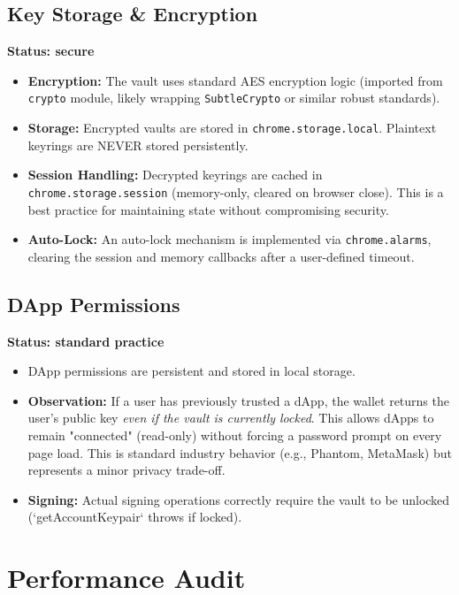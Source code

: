 \documentclass[11pt, a4paper]{article}
\begin{document}
\subsection{Key Storage \& Encryption}
\textbf{Status: secure}
\begin{itemize}
    \item \textbf{Encryption:} The vault uses standard AES encryption logic (imported from \texttt{crypto} module, likely wrapping \texttt{SubtleCrypto} or similar robust standards).
    \item \textbf{Storage:} Encrypted vaults are stored in \texttt{chrome.storage.local}. Plaintext keyrings are NEVER stored persistently.
    \item \textbf{Session Handling:} Decrypted keyrings are cached in \texttt{chrome.storage.session} (memory-only, cleared on browser close). This is a best practice for maintaining state without compromising security.
    \item \textbf{Auto-Lock:} An auto-lock mechanism is implemented via \texttt{chrome.alarms}, clearing the session and memory callbacks after a user-defined timeout.
\end{itemize}

\subsection{DApp Permissions}
\textbf{Status: standard practice}
\begin{itemize}
    \item DApp permissions are persistent and stored in local storage.
    \item \textbf{Observation:} If a user has previously trusted a dApp, the wallet returns the user's public key \textit{even if the vault is currently locked}. This allows dApps to remain "connected" (read-only) without forcing a password prompt on every page load. This is standard industry behavior (e.g., Phantom, MetaMask) but represents a minor privacy trade-off.
    \item \textbf{Signing:} Actual signing operations correctly require the vault to be unlocked (`getAccountKeypair` throws if locked).
\end{itemize}

\section{Performance Audit}
\end{document}
